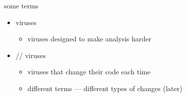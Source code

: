 
\begin{frame}{some terms}
    \begin{itemize}
    \item {} viruses
        \begin{itemize}
        \item viruses designed to make analysis harder
        \end{itemize}
    \item {}// viruses
        \begin{itemize}
        \item viruses that change their code each time
        \item different terms --- different types of changes (later)
        \end{itemize}
    \end{itemize}
\end{frame}
